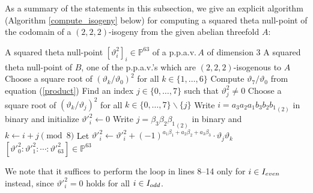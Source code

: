 \documentclass{amsart}
\theoremstyle{definition}
\theoremstyle{plain}
\begin{document}
As a summary of the statements in this subsection, we give an explicit algorithm (Algorithm \ref{compute_isogeny} below) for computing a squared theta null-point of the codomain of a $(2,2,2)$-isogeny from the given abelian threefold $A$:\vspace{-0.7mm}
\begin{algorithm}[htbp]
\begin{algorithmic}[1]
\caption{{\sf \ ComputeOneRichelotIsogeny}}\label{compute_isogeny}
\renewcommand{\algorithmicrequire}{\textbf{Input:}}
\renewcommand{\algorithmicensure}{\textbf{Output:}}
\Require A squared theta null-point $[\vartheta_i^2]_i \in \mathbb{P}^{63}$ of a p.p.a.v.$\,A$ of dimension 3
\Ensure A squared theta null-point of $B$, one of the p.p.a.v.'s which are $(2,2,2)$-isogenous to $A$
\State Choose a square root of $(\vartheta_k/\vartheta_0)^2$ for all $k \in \{1,\ldots,6\}$
\State Compute $\vartheta_7/\vartheta_0$ from equation (\ref{product}) 
\Else
\State Find an index $j \in \{0,\ldots,7\}$ such that $\vartheta_j^2 \neq 0$
\State Choose a square root of $(\vartheta_k/\vartheta_j)^2$ for all $k \in \{0,\ldots,7\}\!\smallsetminus\!\{j\}$
\EndIf
{}
\State Write $i = {a_3a_2a_1b_3b_2b_1}_{(2)}$ in binary and initialize ${\vartheta'}_{\!\!i}^2 \!\leftarrow 0$
\State Write $j = {\beta_3\beta_2\beta_1}_{(2)}$ {in binary} and $k \leftarrow i+j \pmod{8}$
\State Let ${\vartheta'}_{\!\!i}^2 \!\leftarrow {\vartheta'}_{\!\!i}^2 + (-1)^{a_1\beta_1+a_2\beta_2+a_3\beta_3} \cdot \vartheta_j\vartheta_k$
\EndFor
\EndFor\\
\Return $[{\vartheta'}_{\!\!0}^2:{\vartheta'}_{\!\!1}^2:\cdots:{\vartheta'}_{\!\!63}^2] \in \mathbb{P}^{63}$
\end{algorithmic}
\end{algorithm}\vspace{-0.7mm}

\noindent We note that it suffices to perform the loop in lines 8--14 only for $i \in I_{\rm even}$ instead, since ${\vartheta'}_{\!\!i}^2 \!= 0$ holds for all $i \in I_{\rm odd}$.
\end{document}
